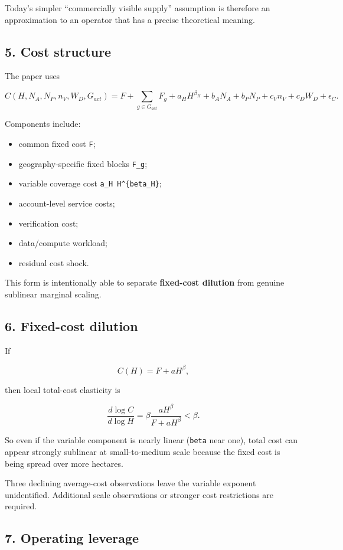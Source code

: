 Today's simpler ``commercially visible supply'' assumption is therefore an
approximation to an operator that has a precise theoretical meaning.

\subsection{5. Cost structure}\label{cost-structure}

The paper uses

\[
C(H,N_A,N_P,n_V,W_D,G_{act})
=F+\sum_{g\in G_{act}}F_g+a_HH^{\beta_H}
+b_AN_A+b_PN_P+c_Vn_V+c_DW_D+\epsilon_C.
\]

Components include:

\begin{itemize}
\tightlist
\item
  common fixed cost \texttt{F};
\item
  geography-specific fixed blocks \texttt{F\_g};
\item
  variable coverage cost \texttt{a\_H\ H\^{}\{beta\_H\}};
\item
  account-level service costs;
\item
  verification cost;
\item
  data/compute workload;
\item
  residual cost shock.
\end{itemize}

This form is intentionally able to separate \textbf{fixed-cost dilution} from genuine
sublinear marginal scaling.

\subsection{6. Fixed-cost dilution}\label{fixed-cost-dilution}

If

\[
C(H)=F+aH^\beta,
\]

then local total-cost elasticity is

\[
\frac{d\log C}{d\log H}
=\beta\frac{aH^\beta}{F+aH^\beta}<\beta.
\]

So even if the variable component is nearly linear (\texttt{beta} near one), total
cost can appear strongly sublinear at small-to-medium scale because the fixed
cost is being spread over more hectares.

Three declining average-cost observations leave the variable exponent
unidentified. Additional scale observations or stronger cost restrictions are
required.

\subsection{7. Operating leverage}\label{operating-leverage}


